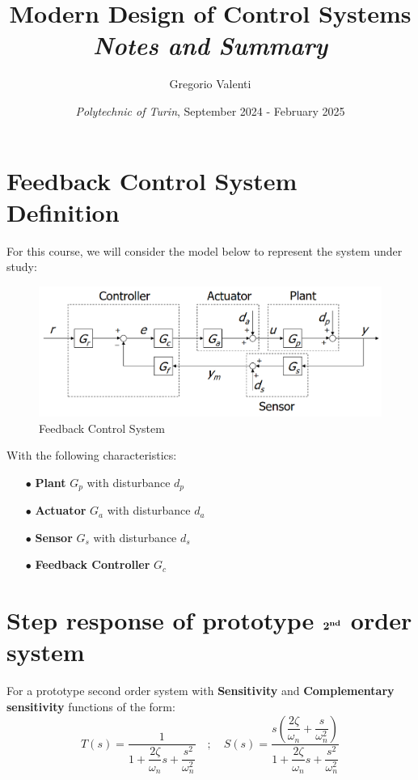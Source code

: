 \documentclass[a4paper,10pt,titlepage]{article}
\title{
	\textbf{\huge{Modern Design of Control Systems}}\\
	\textit{Notes and Summary}}
\author{Gregorio Valenti}
\date{\textit{Polytechnic of Turin}, September 2024 - February 2025}
\numberwithin{equation}{subsection}
\begin{document}
	\maketitle

	\section{Feedback Control System Definition}
	\hspace{1cm}
	For this course, we will consider the model below to represent the system under study:
	
	\begin{figure}[H] %
		\centering
		\includegraphics[scale=1]{images/feedback_loop_description.png}
		\caption{Feedback Control System}
		\label{fig:image1}
	\end{figure}

	With the following characteristics:
	\begin{enumerate}
		\item[$\bullet$] \textbf{Plant} $G_p$ with disturbance $d_p$
		\item[$\bullet$] \textbf{Actuator} $G_a$ with disturbance $d_a$
		\item[$\bullet$] \textbf{Sensor} $G_s$ with disturbance $d_s$
		\item[$\bullet$] \textbf{Feedback Controller} $G_c$ 	
	\end{enumerate}
	
	\section{Step response of prototype $\boldmath{2}^{\textbf{nd}}$ order system}
	For a prototype second order system with \textbf{Sensitivity} and \textbf{Complementary sensitivity} functions of the form:
	\begin{equation}
		T(s) = \dfrac{1}{1+\dfrac{2\zeta}{\omega_n}s+\dfrac{s^2}{\omega_n^2}} \quad ; \quad S(s) = \dfrac{s\left(\dfrac{2\zeta}{\omega_n}+\dfrac{s}{\omega_n^2}\right)}{1+\dfrac{2\zeta}{\omega_n}s+\dfrac{s^2}{\omega_n^2}}
	\end{equation}
	
\end{document}
